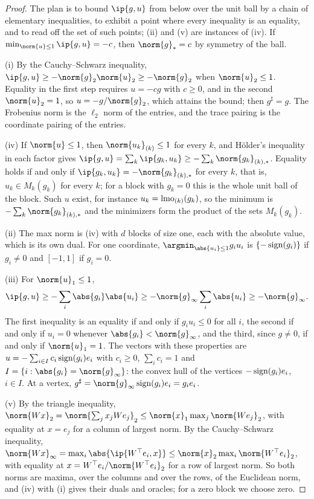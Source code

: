 \begin{refsection}
\begin{proof}
The plan is to bound $\ip{g,u}$ from below over the unit ball by a chain of elementary inequalities, to exhibit a point where every inequality is an equality, and to read off the set of such points; (ii) and (v) are instances of (iv). If $\min_{\norm{u}\le1}\ip{g,u}=-c$, then $\norm{g}_*=c$ by symmetry of the ball.

(i) By the Cauchy--Schwarz inequality, $\ip{g,u}\ge-\norm{g}_2\norm{u}_2\ge-\norm{g}_2$ when $\norm{u}_2\le1$. Equality in the first step requires $u=-cg$ with $c\ge0$, and in the second $\norm{u}_2=1$, so $u=-g/\norm{g}_2$, which attains the bound; then $g^\sharp=g$. The Frobenius norm is the $\ell_2$ norm of the entries, and the trace pairing is the coordinate pairing of the entries.

(iv) If $\norm{u}\le1$, then $\norm{u_k}_{(k)}\le1$ for every $k$, and Hölder's inequality in each factor gives $\ip{g,u}=\sum_k\ip{g_k,u_k}\ge-\sum_k\norm{g_k}_{(k),*}$. Equality holds if and only if $\ip{g_k,u_k}=-\norm{g_k}_{(k),*}$ for every $k$, that is, $u_k\in M_k(g_k)$ for every $k$; for a block with $g_k=0$ this is the whole unit ball of the block. Such $u$ exist, for instance $u_k=\operatorname{lmo}_{(k)}(g_k)$, so the minimum is $-\sum_k\norm{g_k}_{(k),*}$ and the minimizers form the product of the sets $M_k(g_k)$.

(ii) The max norm is (iv) with $d$ blocks of size one, each with the absolute value, which is its own dual. For one coordinate, $\argmin_{\abs{u_i}\le1}g_iu_i$ is $\{-\operatorname{sign}(g_i)\}$ if $g_i\ne0$ and $[-1,1]$ if $g_i=0$.

(iii) For $\norm{u}_1\le1$,
\[
  \ip{g,u}\ge-\sum_i\abs{g_i}\abs{u_i}\ge-\norm{g}_\infty\sum_i\abs{u_i}\ge-\norm{g}_\infty .
\]
The first inequality is an equality if and only if $g_iu_i\le0$ for all $i$, the second if and only if $u_i=0$ whenever $\abs{g_i}<\norm{g}_\infty$, and the third, since $g\ne0$, if and only if $\norm{u}_1=1$. The vectors with these properties are $u=-\sum_{i\in I}c_i\operatorname{sign}(g_i)e_i$ with $c_i\ge0$, $\sum_ic_i=1$ and $I=\{i:\abs{g_i}=\norm{g}_\infty\}$: the convex hull of the vertices $-\operatorname{sign}(g_i)e_i$, $i\in I$. At a vertex, $g^\sharp=\norm{g}_\infty\sign(g_i)e_i=g_ie_i$.

(v) By the triangle inequality, $\norm{Wx}_2=\norm{\sum_jx_jWe_j}_2\le\norm{x}_1\max_j\norm{We_j}_2$, with equality at $x=e_j$ for a column of largest norm. By the Cauchy--Schwarz inequality, $\norm{Wx}_\infty=\max_i\abs{\ip{W^\top e_i,x}}\le\norm{x}_2\max_i\norm{W^\top e_i}_2$, with equality at $x=W^\top e_i/\norm{W^\top e_i}_2$ for a row of largest norm. So both norms are maxima, over the columns and over the rows, of the Euclidean norm, and (iv) with (i) gives their duals and oracles; for a zero block we choose zero.


\end{proof}
\end{refsection}
